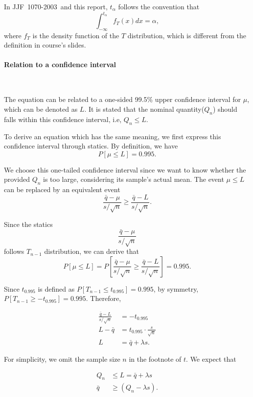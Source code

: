 \documentclass[conf]{new-aiaa}
\begin{document}
In JJF\ 1070-2003\ and this report, $t_\alpha$ follows the convention that 
$$\int_{-\infty}^{t_\alpha}f_T(x) dx = \alpha,$$
where $f_T$ is the density function of the $T$ distribution, which is different from the definition in course's slides.

\paragraph{Relation to a confidence interval}\ \medskip

The equation can be related to a one-sided 99.5\% upper confidence interval for $\mu$, which can be denoted as $L$. It is stated that the nominal quantity($Q_n$) should falls within this confidence interval, i.e, $Q_n \leqslant L$. \medskip

To derive an equation which has the same meaning, we first express this confidence interval through statics. By definition, we have
$$
    P[\mu \leqslant L] = 0.995.
$$

We choose this one-tailed confidence interval since we want to know whether the provided $Q_n$ is too large, considering its sample's actual mean. The event $\mu \leqslant L$ can be replaced by an equivalent event $$\frac{\bar{q} - \mu}{s/\sqrt{n}} \geqslant \frac{\bar{q} - L}{s/\sqrt{n}}.$$

Since the statics $$\frac{\bar{q} - \mu}{s / \sqrt{n}}$$ follows $T_{n-1}$ distribution, we can derive that
$$
    P[\mu \leqslant L] = P\left[\frac{\bar{q} - \mu}{s/\sqrt{n}} \geqslant \frac{\bar{q} - L}{s/\sqrt{n}}\right] = 0.995.
$$

Since $t_{0.995}$ is defined as $P[T_{n-1} \leqslant t_{0.995}] = 0.995$, by symmetry, $P[T_{n-1} \geqslant -t_{0.995}] = 0.995$. Therefore,

$$
    \begin{aligned}
         \frac{\bar{q} - L}{s/\sqrt{n}} &= -t_{0.995}\\
         L - \bar{q} &= t_{0.995}\cdot \frac{s}{\sqrt{n}}\\
         L &= \bar{q} + \lambda s.
    \end{aligned}
$$

For simplicity, we omit the sample size $n$ in the footnote of $t$. We expect that

$$
    \begin{aligned}
        Q_n &\leqslant  L = \bar{q} + \lambda s  \\ 
        \bar{q} &\geqslant (Q_n - \lambda s).
    \end{aligned}
$$
\end{document}
